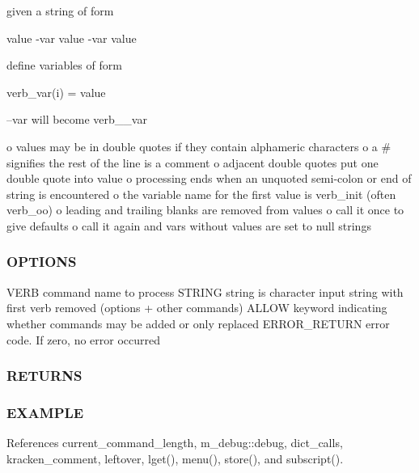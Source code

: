 given a string of form

value -\/var value -\/var value

define variables of form

verb\+\_\+var(i) = value

--var will become verb\+\_\+\+\_\+var

o values may be in double quotes if they contain alphameric characters o a \# signifies the rest of the line is a comment o adjacent double quotes put one double quote into value o processing ends when an unquoted semi-\/colon or end of string is encountered o the variable name for the first value is verb\+\_\+init (often verb\+\_\+oo) o leading and trailing blanks are removed from values o call it once to give defaults o call it again and vars without values are set to null strings

\subsubsection*{O\+P\+T\+I\+O\+NS}

\begin{DoxyVerb}VERB          command name to process
STRING        string is character input string with first verb removed (options + other commands)
ALLOW         keyword indicating whether commands may be added or only replaced
ERROR_RETURN  error code. If zero, no error occurred
\end{DoxyVerb}


\subsubsection*{R\+E\+T\+U\+R\+NS}

\subsubsection*{E\+X\+A\+M\+P\+LE}

References current\+\_\+command\+\_\+length, m\+\_\+debug\+::debug, dict\+\_\+calls, kracken\+\_\+comment, leftover, lget(), menu(), store(), and subscript().

